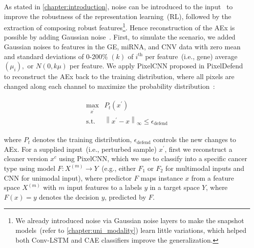 \hspace*{3.5mm} As stated in \cref{chapter:introduction}, noise can be introduced to the input~\cite{min2018survey} to improve the robustness of the representation learning~(RL), followed by the extraction of composing robust features\footnote{We already introduced noise via Gaussian noise layers to make the snapshot models~(refer to \cref{chapter:uni_modality}) learn little variations, which helped both Conv-LSTM and CAE classifiers improve the generalization. }. Hence reconstruction of the AEx is possible by adding Gaussian noise~\cite{OOD19}. First, to simulate the scenario, we added Gaussian noises to features in the GE, miRNA, and CNV data with zero mean and standard deviations of 0-200\% $(k)$ of $i^{\text {th}}$ per feature~(i.e., gene) average $\left(\mu_{i}\right),$ or $N(0, k \mu)$ per feature. We apply PixelCNN proposed in PixelDefend~\cite{song2017pixeldefend} to reconstruct the AEx back to the training distribution, where all pixels are changed along each channel to maximize the probability distribution~\cite{song2017pixeldefend}:

\vspace{-6mm}
\begin{align}
    \begin{array}{cl}
        \max _{x^{\prime}} & {P}_{t}\left(x^{\prime}\right) \\
        \text {s.t.} & \left\|x^{\prime}-x\right\|_{\infty} \leq \epsilon_{\text {defend}}
    \end{array}
\end{align}

\hspace*{3.5mm} where ${P}_{t}$ denotes the training distribution, $\epsilon_{\text {defend}}$ controls the new changes to AEx. For a supplied input~(i.e., perturbed sample) $x^{\prime}$, first we reconstruct a cleaner version $x^c$ using PixelCNN, which we use to classify into a specific cancer type using model $F: {X}^{(m)} \rightarrow {Y}$~(e.g., either $F_1$ or $F_2$ for multimodal inputs and CNN for unimodal input), where predictor $F$ maps instance $x$ from a feature space ${X}^{(m)}$ with $m$ input features to a labels $y$ in a target space ${Y}$, where $F(x)=y$ denotes the decision $y$, predicted by $F$. %

